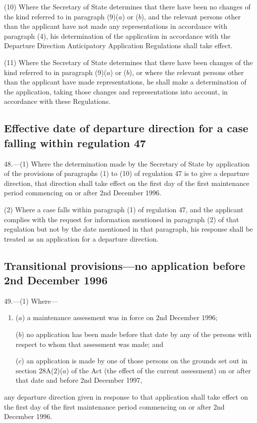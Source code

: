 \documentclass[a4paper]{article}
\begin{document}
(10) Where the Secretary of State determines that there have been no changes of
the kind referred to in paragraph (9)($a$) or ($b$), and the relevant persons other
than the applicant have not made any representations in accordance with
paragraph (4), his determination of the application in accordance with the
Departure Direction Anticipatory Application Regulations shall take effect.

(11) Where the Secretary of State determines that there have been changes of the
kind referred to in paragraph (9)($a$) or ($b$), or where the relevant persons other
than the applicant have made representations, he shall make a determination of
the application, taking those changes and representations into account, in
accordance with these Regulations.

\subsection[47. Effective date of departure direction for a case falling within regulation
47]{Effective date of departure direction for a case falling within regulation
47}

48.—(1) Where the determination made by the Secretary of State by application
of the provisions of paragraphs (1) to (10) of regulation 47 is to give a
departure direction, that direction shall take effect on the first day of the
first maintenance period commencing on or after 2nd December 1996.

(2) Where a case falls within paragraph (1) of regulation 47, and the applicant
complies with the request for information mentioned in paragraph (2) of that
regulation but not by the date mentioned in that paragraph, his response shall
be treated as an application for a departure direction.

\subsection[49. Transitional provisions—no application before 2nd December 1996]{Transitional provisions—no application before 2nd December 1996}

49.—(1) Where—
\begin{enumerate}\item[]
($a$) a maintenance assessment was in force on 2nd December 1996;

($b$) no application has been made before that date by any of the persons with
respect to whom that assessment was made; and

($c$) an application is made by one of those persons on the grounds set out in
section 28A(2)($a$) of the Act (the effect of the current assessment) on or after
that date and before 2nd December 1997,
\end{enumerate}
any departure direction given in response to that application shall take effect
on the first day of the first maintenance period commencing on or after 2nd
December 1996.
\end{document}
